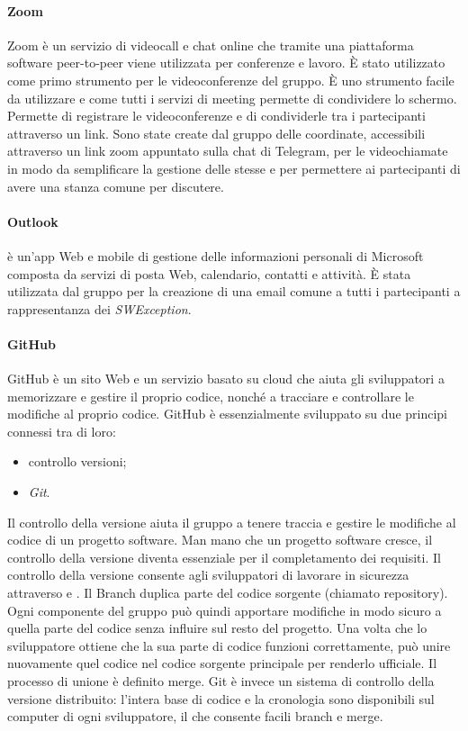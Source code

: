 \paragraph{Zoom}
Zoom è un servizio di videocall e chat online che tramite una piattaforma software peer-to-peer viene utilizzata per conferenze e lavoro. È stato utilizzato come primo strumento per le videoconferenze del gruppo. È uno strumento facile da utilizzare e come tutti i servizi di meeting permette di condividere lo schermo. Permette di registrare le videoconferenze e di condividerle tra i partecipanti attraverso un link. Sono state create dal gruppo delle coordinate, accessibili attraverso un link zoom appuntato sulla chat di Telegram, per le videochiamate in modo da semplificare la gestione delle stesse e per permettere ai partecipanti di avere una stanza comune per discutere.

\paragraph{Outlook}
 è un'app Web e mobile di gestione delle informazioni personali di Microsoft composta da servizi di posta Web, calendario, contatti e attività. È stata utilizzata dal gruppo per la creazione di una email comune a tutti i partecipanti a rappresentanza dei \textit{SWException}.

\paragraph{GitHub}
GitHub è un sito Web e un servizio basato su cloud che aiuta gli sviluppatori a memorizzare e gestire il proprio codice, nonché a tracciare e controllare le modifiche al proprio codice. GitHub è essenzialmente sviluppato su due principi connessi tra di loro:
\begin{itemize}
    \item controllo versioni;
    \item \textit{Git}.
\end{itemize}
Il controllo della versione aiuta il gruppo a tenere traccia e gestire le modifiche al codice di un progetto software. Man mano che un progetto software cresce, il controllo della versione diventa essenziale per il completamento dei requisiti. Il controllo della versione consente agli sviluppatori di lavorare in sicurezza attraverso  e . Il Branch duplica parte del codice sorgente (chiamato repository). Ogni componente del gruppo può quindi apportare modifiche in modo sicuro a quella parte del codice senza influire sul resto del progetto. Una volta che lo sviluppatore ottiene che la sua parte di codice funzioni correttamente, può unire nuovamente quel codice nel codice sorgente principale per renderlo ufficiale. Il processo di unione è definito merge.
Git è invece un sistema di controllo della versione distribuito: l'intera base di codice e la cronologia sono disponibili sul computer di ogni sviluppatore, il che consente facili branch e merge.

